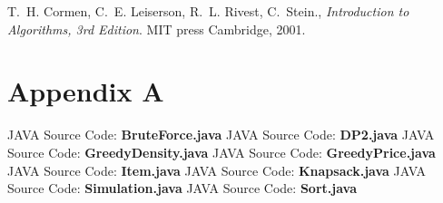 \documentclass[onecolumn, letterpaper, 12pt]{article}
\begin{document}
\begin{thebibliography}{}


T.~H. Cormen, C.~E. Leiserson, R.~L. Rivest, C.~Stein.,
\emph{{Introduction to Algorithms, 3rd Edition}}.
MIT press Cambridge, 2001.

\end{thebibliography}


\newpage
\section*{Appendix A}
\normalsize{JAVA Source Code:  \textbf{BruteForce.java}}
\footnotesize{
	}
\normalsize{JAVA Source Code:  \textbf{DP2.java}}
\footnotesize{
	}
\normalsize{JAVA Source Code:  \textbf{GreedyDensity.java}}
\footnotesize{
	}
\normalsize{JAVA Source Code:  \textbf{GreedyPrice.java}}
\footnotesize{
	}
\normalsize{JAVA Source Code:  \textbf{Item.java}}
\footnotesize{
	}
\normalsize{JAVA Source Code:  \textbf{Knapsack.java}}
\footnotesize{
	}
\normalsize{JAVA Source Code:  \textbf{Simulation.java}}
\footnotesize{
	}
\normalsize{JAVA Source Code:  \textbf{Sort.java}}
\footnotesize{
	}
\end{document}
